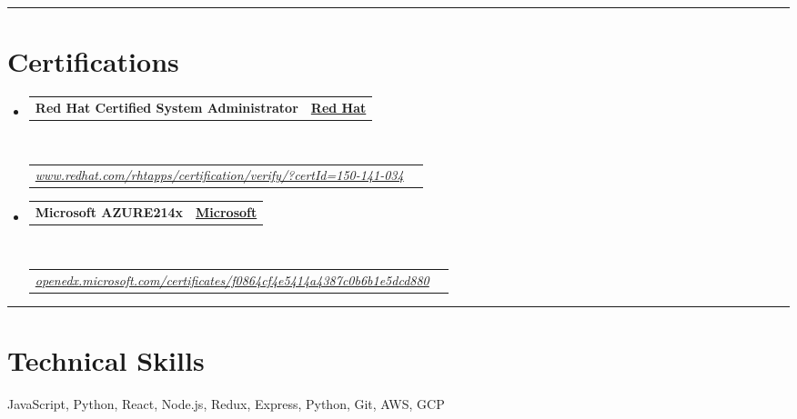 \documentclass[10pt,a4paper,hidelinks]{article}
\makeatletter
\newenvironment{indentsection}[1]%
{\begin{list}{}%
	{\setlength{\leftmargin}{#1}}%
	\item[]%
}
{\end{list}}
\newcommand{\headerrow}[2]
{\begin{tabular*}{\linewidth}{l@{\extracolsep{\fill}}r}
	#1 &
	#2 \\
\end{tabular*}}
\makeatother
\begin{document}
\hrule
\vspace{-0.4em}
\section*{Certifications}

\begin{itemize}
	\parskip=0.1em

	\item 
	\headerrow
		{\textbf{Red Hat Certified System Administrator}}
		{{\href{https://www.redhat.com/}{\textbf{Red Hat}}}}
	\\
	\headerrow
	    {\emph{\href{https://www.redhat.com/rhtapps/certification/verify/?certId=150-141-034}{www.redhat.com/rhtapps/certification/verify/?certId=150-141-034}}}
		{\emph{}}
	
	\item 
	\headerrow
		{\textbf{Microsoft AZURE214x}}
		{{\href{https://www.microsoft.com/}{\textbf{Microsoft}}}}
	\\
	\headerrow
	    {\emph{\href{https://openedx.microsoft.com/certificates/f0864cf4e5414a4387c0b6b1e5dcd880}{openedx.microsoft.com/certificates/f0864cf4e5414a4387c0b6b1e5dcd880}}}
		{\emph{}}

\end{itemize}


\hrule
\vspace{-0.4em}
\section*{Technical Skills}

\begin{indentsection}{\parindent}
\begin{description*}
    JavaScript, Python, React, Node.js, Redux, Express, Python, Git, AWS, GCP 
\end{description*}
\end{indentsection}
\end{document}
